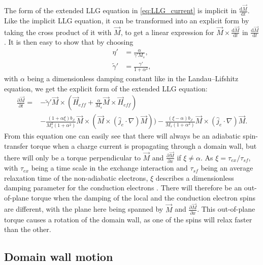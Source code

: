 \documentclass[12pt, a4paper]{article}		%
\numberwithin{equation}{section}
\begin{document}
The form of the extended LLG equation in \eqref{eq:LLG_current} is implicit in $\frac{\textrm{d} \vec{M}}{\textrm{d} t}$. Like the implicit LLG equation, it can be transformed into an explicit form by taking the cross product of it with $\vec{M}$, to get a linear expression for $\vec{M}\times\frac{\textrm{d} \vec{M}}{\textrm{d} t}$ in $\frac{\textrm{d} \vec{M}}{\textrm{d} t}$. It is then easy to show that by choosing
\begin{align}
\eta' &= \frac{\alpha}{\gamma ' M_s}, \\
\tilde{\gamma}' &= \frac{\gamma '}{1+\alpha^2},
\end{align}
with $\alpha$ being a dimensionless damping constant like in the Landau--Lifshitz equation, we get the explicit form of the extended LLG equation:
\begin{align}
\nonumber \frac{\partial \vec{M}}{\partial t} = &-\tilde{\gamma}' \vec{M} \times  (\vec{H}_{eff} + \frac{\alpha}{M_s} \vec{M}\times \vec{H}_{eff}) \\ 
&- \frac{(1+\alpha\xi) b_J}{M_s^2(1+\alpha^2)} \vec{M}\times (\vec{M}\times(\hat{j}_e\cdot\nabla)\vec{M})) - \frac{(\xi-\alpha)b_J}{ M_s(1+\alpha^2)}\vec{M}\times(\hat{j}_e\cdot\nabla)\vec{M}.
\label{eq:LLG_current_explicit}
\end{align}
From this equation one can easily see that there will always be an adiabatic spin-transfer torque when a charge current is propagating through a domain wall, but there will only be a torque perpendicular to $\vec{M}$ and $\frac{\partial\vec{M}}{\partial x}$ if $\xi \neq \alpha$. As $\xi = \tau_{ex}/\tau_{sf}$, with $\tau_{ex}$ being a time scale in the exchange interaction and $\tau_{sf}$ being an average relaxation time of the non-adiabatic electrons, $\xi$ describes a dimensionless damping parameter for the conduction electrons \cite{kruger2006current}. There will therefore be an out-of-plane torque when the damping of the local and the conduction electron spins are different, with the plane here being spanned by $\vec{M}$ and $\frac{\partial\vec{M}}{\partial x}$. This out-of-plane torque causes a rotation of the domain wall, as one of the spins will relax faster than the other.

\subsection{Domain wall motion}
\end{document}
